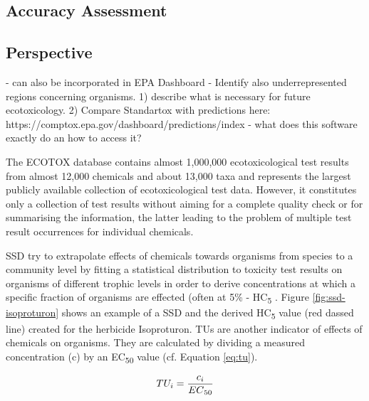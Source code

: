 \subsection*{Accuracy Assessment}


\subsection*{Perspective}

- can also be incorporated in EPA Dashboard
- Identify also underrepresented regions concerning organisms.
1) \citep{staveley_challenge_2016} describe what is necessary for future ecotoxicology.
2) Compare Standartox with predictions here: https://comptox.epa.gov/dashboard/predictions/index
- \citep{gadaleta_new_2018} what does this software exactly do an how to access it?
\fi


The ECOTOX database contains almost 1,000,000 ecotoxicological test results from almost 12,000 chemicals and about 13,000 taxa \citep{usepa_ecotox_2019} and represents the largest publicly available collection of ecotoxicological test data. However, it constitutes only a collection of test results without aiming for a complete quality check or for summarising the information, the latter leading to the problem of multiple test result occurrences for individual chemicals.


\iffalse
SSD try to extrapolate effects of chemicals towards organisms from species to a community level by fitting a statistical distribution to toxicity test results on organisms of different trophic levels in order to derive concentrations at which a specific fraction of organisms are effected (often at 5\% - HC\textsubscript{5} \citep{posthuma_species_2002}. Figure \ref{fig:ssd-isoproturon} shows an example of a SSD and the derived HC\textsubscript{5} value (red dassed line) created for the herbicide Isoproturon. TUs are another indicator of effects of chemicals on organisms. They are calculated by dividing a measured concentration (c) by an EC\textsubscript{50} value (cf. Equation \ref{eq:tu}).

\begin{equation}
    TU_i = \frac{c_i}{EC\textsubscript{50}}
    \label{eq:tu}
\end{equation}


